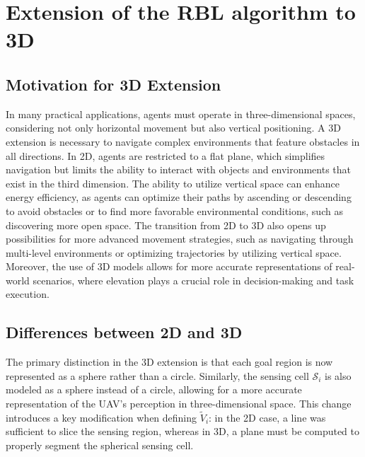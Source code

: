 \section{Extension of the RBL algorithm to 3D}
    \subsection{Motivation for 3D Extension}
        In many practical applications, agents must operate in three-dimensional spaces, considering not only horizontal movement but also vertical positioning.
        A 3D extension is necessary to navigate complex environments that feature obstacles in all directions.
        In 2D, agents are restricted to a flat plane, which simplifies navigation but limits the ability to interact with objects and environments that exist in the third dimension.
        The ability to utilize vertical space can enhance energy efficiency, as agents can optimize their paths by ascending or descending to avoid obstacles or to find more favorable environmental conditions, such as discovering more open space.
        The transition from 2D to 3D also opens up possibilities for more advanced movement strategies, such as navigating through multi-level environments or optimizing trajectories by utilizing vertical space.  
        Moreover, the use of 3D models allows for more accurate representations of real-world scenarios, where elevation plays a crucial role in decision-making and task execution.


    \subsection{Differences between 2D and 3D}
        The primary distinction in the 3D extension is that each goal region is now represented as a sphere rather than a circle.  
        Similarly, the sensing cell $\mathcal{S}_i$ is also modeled as a sphere instead of a circle, allowing for a more accurate representation of the UAV's perception in three-dimensional space.  
        This change introduces a key modification when defining $\tilde{V}_i$: in the 2D case, a line was sufficient to slice the sensing region, whereas in 3D, a plane must be computed to properly segment the spherical sensing cell. 
        
